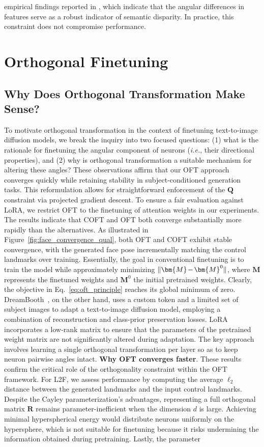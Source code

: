 {\begin{itemize}[leftmargin=*,nosep]
empirical findings reported in \cite{liu2018decoupled,chen2020angular}, which indicate that the angular differences in features serve as a robust indicator of semantic disparity. In practice, this constraint does not compromise performance. \section{Orthogonal Finetuning}

\subsection{Why Does Orthogonal Transformation Make Sense?}

To motivate orthogonal transformation in the context of finetuning text-to-image diffusion models, we break the inquiry into two focused questions: (1) what is the rationale for finetuning the angular component of neurons (\emph{i.e.}, their directional properties), and (2) why is orthogonal transformation a suitable mechanism for altering these angles? These observations affirm that our OFT approach converges quickly while retaining stability in subject-conditioned generation tasks. This reformulation allows for straightforward enforcement of the $\bm{Q}$ constraint via projected gradient descent. To ensure a fair evaluation against LoRA, we restrict OFT to the finetuning of attention weights in our experiments. The results indicate that COFT and OFT both converge substantially more rapidly than the alternatives. As illustrated in Figure~\ref{fig:face_convergence_qual}, both OFT and COFT exhibit stable convergence, with the generated face pose incrementally matching the control landmarks over training. Essentially, the goal in conventional finetuning is to train the model while approximately minimizing $\thickmuskip=2mu \medmuskip=2mu \| \bm{M} - \bm{M}^0\|$, where $\bm{M}$ represents the finetuned weights and $\bm{M}^0$ the initial pretrained weights. Clearly, the objective in Eq.~\eqref{eq:oft_principle} reaches its global minimum of zero. DreamBooth~\cite{ruiz2023dreambooth}, on the other hand, uses a custom token and a limited set of subject images to adapt a text-to-image diffusion model, employing a combination of reconstruction and class-prior preservation losses. LoRA incorporates a low-rank matrix to ensure that the parameters of the pretrained weight matrix are not significantly altered during adaptation. The key approach involves learning a single orthogonal transformation per layer so as to keep neuron pairwise angles intact. \textbf{Why OFT converges faster}. These results confirm the critical role of the orthogonality constraint within the OFT framework. For L2F, we assess performance by computing the average $\ell_2$ distance between the generated landmarks and the input control landmarks. Despite the Cayley parameterization’s advantages, representing a full orthogonal matrix $\bm{R}$ remains parameter-inefficient when the dimension $d$ is large. Achieving minimal hyperspherical energy would distribute neurons uniformly on the hypersphere, which is not suitable for finetuning because it risks undermining the information obtained during pretraining. Lastly, the parameter 
\end{itemize}}
